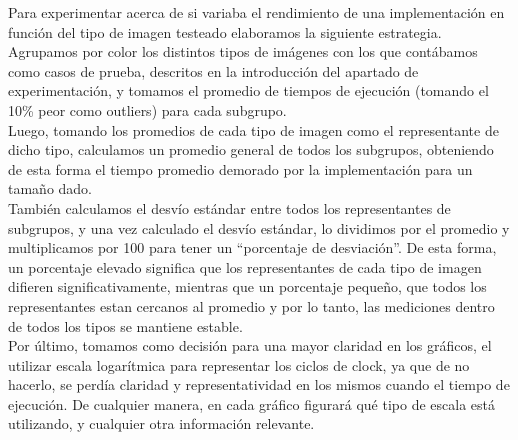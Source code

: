 Para experimentar acerca de si variaba el rendimiento de una implementación en función del tipo de imagen testeado elaboramos la siguiente estrategia. Agrupamos por color los distintos tipos de imágenes con los que contábamos como casos de prueba, descritos en la introducción del apartado de experimentación, y tomamos el promedio de tiempos de ejecución (tomando el 10\% peor como outliers) para cada subgrupo.\\ 
Luego, tomando los promedios de cada tipo de imagen como el representante de dicho tipo, calculamos un promedio general de todos los subgrupos, obteniendo de esta forma el tiempo promedio demorado por la implementación para un tamaño dado.\\
También calculamos el desvío estándar entre todos los representantes de subgrupos, y una vez calculado el desvío estándar, lo dividimos por el promedio y multiplicamos por 100 para tener un “porcentaje de desviación”. De esta forma, un porcentaje elevado significa que los representantes de cada tipo de imagen difieren significativamente, mientras que un porcentaje pequeño, que todos los representantes estan cercanos al promedio y por lo tanto, las mediciones dentro de todos los tipos se mantiene estable.\\

Por último, tomamos como decisión para una mayor claridad en los gráficos, el utilizar escala logarítmica para representar los ciclos de clock, ya que de no hacerlo, se perdía claridad y representatividad en los mismos cuando el tiempo de ejecución. De cualquier manera, en cada gráfico figurará qué tipo de escala está utilizando, y cualquier otra información relevante.\\\\\\\\\\\\\\\\\\

